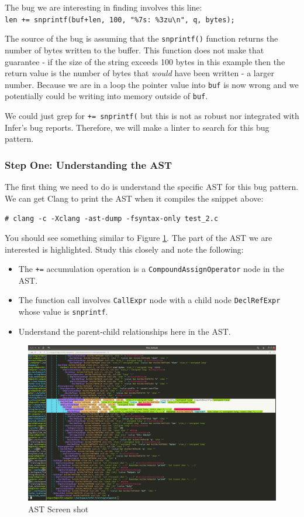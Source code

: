 \noindent The bug we are interesting in finding involves this line:\\
\verb|len += snprintf(buf+len, 100, "%7s: %3zu\n", q, bytes);|

\noindent The source of the bug is assuming that the \verb|snprintf()| function 
returns the number of bytes written to the buffer. This function
does not make that guarantee - if the size of the string exceeds 100 bytes
in this example then the return value is the number of bytes that \textit{would} 
have been written - a larger number. Because we are in a loop the pointer value
into \verb|buf| is now wrong and we potentially could be writing into memory outside of 
\verb|buf|.

We could just grep for \verb|+= snprintf(| but this is not as robust nor integrated 
with Infer's bug reports. Therefore, we will make a linter to search for this bug pattern.

\subsubsection{Step One: Understanding the AST}

The first thing we need to do is understand the specific AST for this bug pattern.
We can get Clang to print the AST when it compiles the snippet above:

\verb|# clang -c -Xclang -ast-dump -fsyntax-only test_2.c|

You should see something similar to Figure \ref{fig:clang-ast}. The part of the AST
we are interested is highlighted. Study this closely and note the following:

\begin{itemize}
	\item The \verb|+=| accumulation operation is a \verb|CompoundAssignOperator| node in the AST.
	\item The function call involves \verb|CallExpr| node with a child node \verb|DeclRefExpr|
	whose value is \verb|snprintf|.
	\item Understand the parent-child relationships here in the AST.
\end{itemize}

\begin{figure}[t]
	\centering
	\includegraphics[width=\linewidth]{img/clang-ast}
	\caption[AST]{AST Screen shot}
	\label{fig:clang-ast}
\end{figure}

